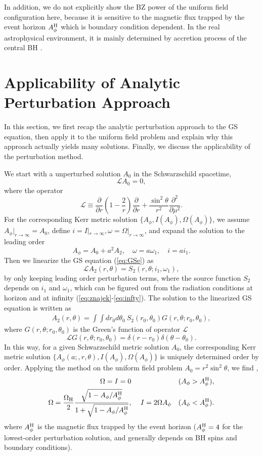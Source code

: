 \documentclass[iop,apj]{emulateapj}
\def\nn{\nonumber}
\def\sst{\sin^2\theta}
\def\be{\begin{equation}}
\def\ee{\end{equation}}
\def\ben{\begin{eqnarray}}
\def\een{\end{eqnarray}}
\def\WH{\Omega_{\rm H}}
\def\AB{A_\phi^{\rm H}}
\begin{document}
In addition, we do not explicitly show the BZ power of the uniform field configuration here,
because it is sensitive to the magnetic flux trapped by the event horizon $\AB$ which is boundary condition dependent.
In the real astrophysical environment, it is mainly determined by accretion process of the
central BH \citep[e.g.][]{Garofalo2009}.






\section{Applicability of Analytic Perturbation Approach}
\label{sec:pert}
In this section, we first recap the analytic perturbation approach to the GS equation,
then apply it to the uniform field problem \citep{Pan2014, Pan2015b} and explain
why this approach actually yields many solutions.
Finally, we discuss the applicability of the perturbation method.

We start with a unperturbed solution $A_0$ in the Schwarzschild spacetime,
\be
\label{eq:lgs}
\mathcal L A_0 =0,
\ee
where the operator
\be
\mathcal L\equiv\frac{\partial}{\partial
r}\left(1-\frac{2}{r}\right)\frac{\partial}{\partial r}
 +\frac{\sst}{r^2}\frac{\partial^2}{\partial \mu^2}.
\ee
For the corresponding Kerr metric solution $\{A_\phi, I(A_\phi), \Omega(A_\phi)\}$,
we assume $A_\phi|_{r\rightarrow\infty} = A_0$,
define $i = I|_{r\rightarrow\infty}, \omega = \Omega|_{r\rightarrow\infty}$,
and expand the solution to the leading order
\be
A_\phi = A_0 + a^2 A_2 , \quad \omega = a \omega_1 ,\quad i = a i_1.
\ee
Then we linearize the GS equation (\ref{eq:GSe}) as
\be
\mathcal L A_2(r,\theta) = S_2(r,\theta; i_1,\omega_1),
\ee
by only keeping leading order perturbation terms, where the source function $S_2$
depends on $i_1$ and $\omega_1$, which can be figured out from
the radiation conditions at  horizon and at infinity (\ref{eq:znajek}-\ref{eq:infty}).
The solution to the linearized GS equation is written as
\be
\begin{aligned}
A_2(r,\theta) =
\int\int dr_0  d\theta_0 \ S_2(r_0,\theta_0) G(r,\theta; r_0,\theta_0),
\end{aligned}
\ee
where $G(r,\theta; r_0,\theta_0)$ is the Green's function of operator $\mathcal L$ \citep{Petterson1974,Blandford1977}
\be
\mathcal LG(r,\theta; r_0,\theta_0) = \delta(r-r_0) \delta(\theta-\theta_0).
\ee
In this way, for a given Schwarzschild metric solution $A_0$, the corresponding
Kerr metric solution $\{A_\phi(a;,r,\theta), I(A_\phi),\Omega(A_\phi) \}$
is uniquely determined order by order.
Applying the method on the uniform field  problem $A_0=r^2\sst$, we find \citep{Beskin2013, Pan2014, Gralla2015},
\ben
\Omega = I = 0 && \quad (A_\phi > \AB), \\
\Omega = \frac{\WH}{2}\frac{\sqrt{1-A_\phi/\AB}}{1+\sqrt{1-A_\phi/\AB}}, && \ I=2\Omega A_\phi \quad (A_\phi < \AB).\nn
\een
where $\AB$ is the magnetic flux trapped by the event horizon
($\AB =4$ for the lowest-order perturbation solution, and generally depends on  BH spins and boundary conditions).
\end{document}
